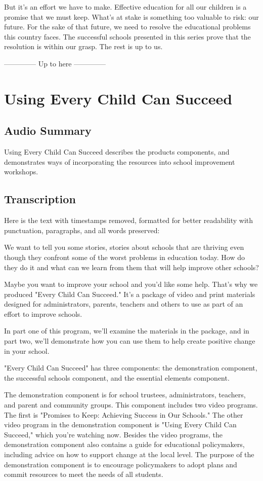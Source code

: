 But it's an effort we have to make.
Effective education for all our children is a promise that we must keep.
What's at stake is something too valuable to risk: our future.
For the sake of that future, we need to resolve the educational problems this country faces.
The successful schools presented in this series prove that the resolution is within our grasp.
The rest is up to us.

-------------- Up to here --------------

\section{Using Every Child Can Succeed}

\subsection{Audio Summary}

Using Every Child Can Succeed describes the products components, and demonstrates ways of incorporating the resources into school improvement workshops.

\subsection{Transcription}

Here is the text with timestamps removed, formatted for better readability with punctuation, paragraphs, and all words preserved:

We want to tell you some stories, stories about schools that are thriving even though they confront some of the worst problems in education today.
How do they do it and what can we learn from them that will help improve other schools?

Maybe you want to improve your school and you'd like some help.
That's why we produced "Every Child Can Succeed." It's a package of video and print materials designed for administrators, parents, teachers and others to use as part of an effort to improve schools.

In part one of this program, we'll examine the materials in the package, and in part two, we'll demonstrate how you can use them to help create positive change in your school.

"Every Child Can Succeed" has three components: the demonstration component, the successful schools component, and the essential elements component.

The demonstration component is for school trustees, administrators, teachers, and parent and community groups.
This component includes two video programs.
The first is "Promises to Keep: Achieving Success in Our Schools." The other video program in the demonstration component is "Using Every Child Can Succeed," which you're watching now.
Besides the video programs, the demonstration component also contains a guide for educational policymakers, including advice on how to support change at the local level.
The purpose of the demonstration component is to encourage policymakers to adopt plans and commit resources to meet the needs of all students.

